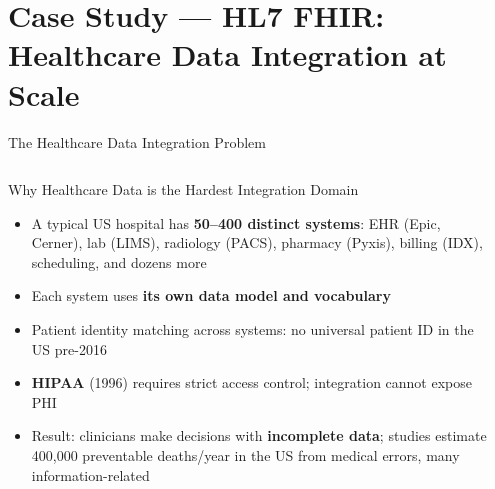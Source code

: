 \documentclass[aspectratio=169,10pt]{beamer}
\begin{document}
\section{Case Study — HL7 FHIR: Healthcare Data Integration at Scale}

\begin{frame}{The Healthcare Data Integration Problem}
  \begin{columns}[T]
      \begin{block}{Why Healthcare Data is the Hardest Integration Domain}
        \begin{itemize}
          \item A typical US hospital has \textbf{50–400 distinct systems}:
                EHR (Epic, Cerner), lab (LIMS), radiology (PACS),
                pharmacy (Pyxis), billing (IDX), scheduling, and dozens more
          \item Each system uses \textbf{its own data model and vocabulary}
          \item Patient identity matching across systems:
                no universal patient ID in the US pre-2016
          \item \textbf{HIPAA} (1996) requires strict access control;
                integration cannot expose PHI
          \item Result: clinicians make decisions with \textbf{incomplete data};
                studies estimate 400{,}000 preventable deaths/year in the US
                from medical errors, many information-related
        \end{itemize}
      \end{block}

      \begin{center}
\end{center}
\end{columns}
\end{frame}
\end{document}
